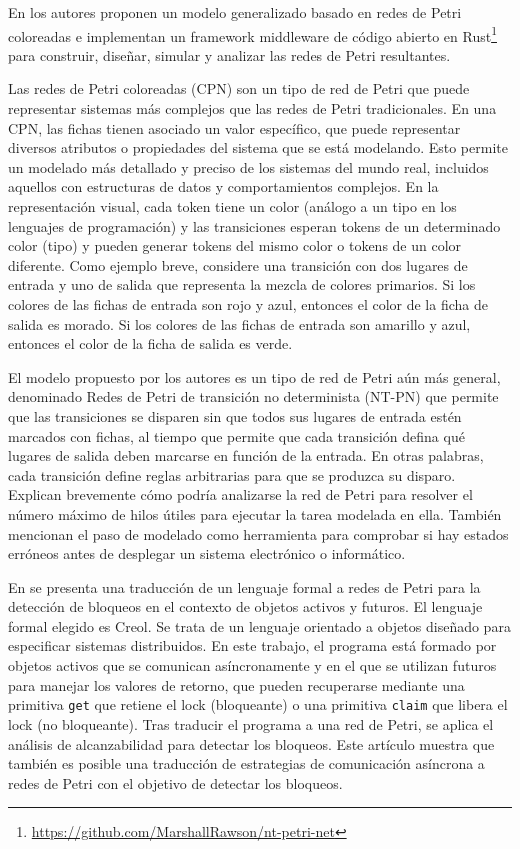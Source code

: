 En \cite{rawson2022petri} los autores proponen un modelo generalizado basado en redes
de Petri coloreadas e implementan un framework middleware de código abierto
en Rust\footnote{\url{https://github.com/MarshallRawson/nt-petri-net}}
para construir, diseñar, simular y analizar las redes de Petri resultantes.

Las redes de Petri coloreadas (\acrfull{CPN}) son un tipo de red de Petri que puede representar sistemas
más complejos que las redes de Petri tradicionales. En una CPN, las fichas tienen asociado un
valor específico, que puede representar diversos atributos o propiedades del sistema que se está
modelando. Esto permite un modelado más detallado y preciso de los sistemas del mundo real,
incluidos aquellos con estructuras de datos y comportamientos complejos. En la representación
visual, cada token tiene un color (análogo a un tipo en los lenguajes de programación) y las
transiciones esperan tokens de un determinado color (tipo) y pueden generar tokens del mismo
color o tokens de un color diferente. Como ejemplo breve, considere una transición con dos
lugares de entrada y uno de salida que representa la mezcla de colores primarios. Si los colores
de las fichas de entrada son rojo y azul, entonces el color de la ficha de salida es morado. Si los
colores de las fichas de entrada son amarillo y azul, entonces el color de la ficha de salida es
verde.

El modelo propuesto por los autores es un tipo de red de Petri aún más general, denominado
Redes de Petri de transición no determinista (\acrfull{NT-PN}) que permite que las transiciones se
disparen sin que todos sus lugares de entrada estén marcados con fichas, al tiempo que permite
que cada transición defina qué lugares de salida deben marcarse en función de la entrada. En
otras palabras, cada transición define reglas arbitrarias para que se produzca su disparo.
Explican brevemente cómo podría analizarse la red de Petri para resolver el número máximo de
hilos útiles para ejecutar la tarea modelada en ella. También mencionan el paso de modelado
como herramienta para comprobar si hay estados erróneos antes de desplegar un sistema
electrónico o informático.

En \cite{deboer2013petri} se presenta una traducción de un lenguaje formal a redes de Petri para
la detección de bloqueos en el contexto de objetos activos y futuros. El lenguaje formal
elegido es \acrfull{Creol}. Se trata de un lenguaje
orientado a objetos diseñado para especificar sistemas distribuidos.
En este trabajo, el programa está
formado por objetos activos que se comunican asíncronamente y en el que se utilizan futuros
para manejar los valores de retorno, que pueden recuperarse mediante una primitiva \texttt{get} que
retiene el lock (bloqueante) o una primitiva \texttt{claim} que libera el lock (no bloqueante).
Tras traducir el programa a una red de Petri, se aplica el análisis de alcanzabilidad para detectar
los bloqueos. Este artículo muestra que también es posible una traducción de estrategias de
comunicación asíncrona a redes de Petri con el objetivo de detectar los bloqueos.